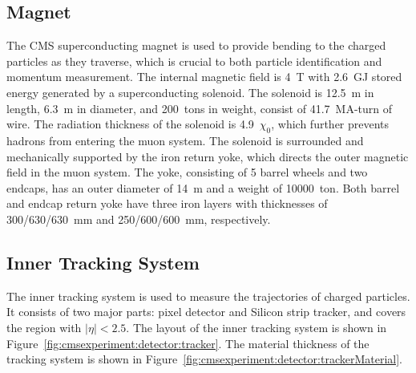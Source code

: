 


\subsection{Magnet}
The CMS superconducting magnet \cite{cms:magnetTdr:Acquistapace:1997fm} is used to provide bending to the charged particles as they traverse, which is crucial to both particle identification and momentum measurement. The internal magnetic field is 4~T with 2.6~GJ stored energy generated by a superconducting solenoid. The solenoid is 12.5~m in length, 6.3~m in diameter, and 200~tons in weight, consist of 41.7~MA-turn of wire. The radiation thickness of the solenoid is 4.9~$\chi_0$, which further prevents hadrons from entering the muon system. The solenoid is surrounded and mechanically supported by the iron return yoke, which directs the outer magnetic field in the muon system. The yoke, consisting of 5 barrel wheels and two endcaps, has an outer diameter of 14~m and a weight of 10000~ton. Both barrel and endcap return yoke have three iron layers with thicknesses of 300/630/630~mm and 250/600/600~mm, respectively.


\subsection{Inner Tracking System}
The inner tracking system \cite{cms:trackerTdr:CMS:1997tlf} is used to measure the trajectories of charged particles. It consists of two major parts: pixel detector and Silicon strip tracker, and covers the region with $|\eta|<2.5$. The layout of the inner tracking system is shown in Figure~\ref{fig:cmsexperiment:detector:tracker}.  The material thickness of the tracking system is shown in Figure~\ref{fig:cmsexperiment:detector:trackerMaterial}.


